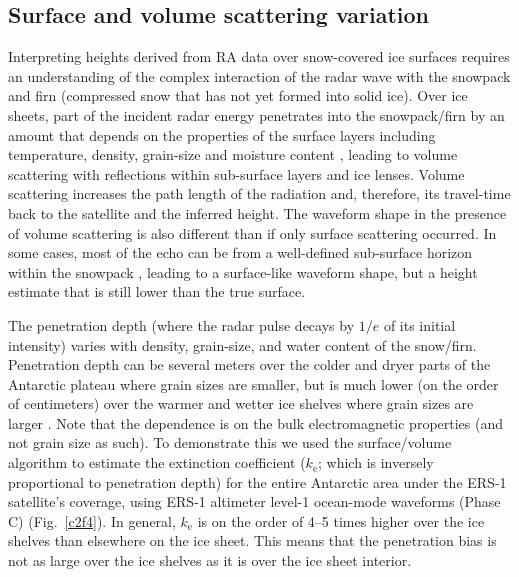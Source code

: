 \subsection{Surface and volume scattering variation}
\label{sec:bs-variation}

Interpreting heights derived from RA data over snow-covered ice surfaces requires an understanding of the complex interaction of the radar wave with the snowpack and firn (compressed snow that has not yet formed into solid ice). Over ice sheets, part of the incident radar energy penetrates into the snowpack/firn \parencite{Ridley1988} by an amount that depends on the properties of the surface layers including temperature, density, grain-size and moisture content \parencite{Davis1993}, leading to volume scattering with reflections within sub-surface layers and ice lenses. Volume scattering increases the path length of the radiation and, therefore, its travel-time back to the satellite and the inferred height. The waveform shape in the presence of volume scattering is also different than if only surface scattering occurred. In some cases, most of the echo can be from a well-defined sub-surface horizon within the snowpack \parencite{Thomas2008}, leading to a surface-like waveform shape, but a height estimate that is still lower than the true surface.

The penetration depth (where the radar pulse decays by $1/e$ of its initial intensity) varies with density, grain-size, and water content of the snow/firn. Penetration depth can be several meters over the colder and dryer parts of the Antarctic plateau where grain sizes are smaller, but is much lower (on the order of centimeters) over the warmer and wetter ice shelves where grain sizes are larger \parencite{Davis1996}. Note that the dependence is on the bulk electromagnetic properties (and not grain size as such). To demonstrate this we used the \parencite{Davis1993} surface/volume algorithm to estimate the extinction coefficient ($k_\text{e}$; which is inversely proportional to penetration depth) for the entire Antarctic area under the ERS-1 satellite's coverage, using ERS-1 altimeter level-1 ocean-mode waveforms (Phase C) (Fig.~\ref{c2f4}). In general, $k_\text{e}$ is on the order of 4--5 times higher over the ice shelves than elsewhere on the ice sheet. This means that the penetration bias is not as large over the ice shelves as it is over the ice sheet interior.


